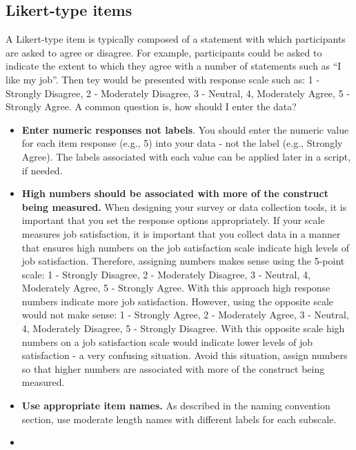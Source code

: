 \documentclass[
]{krantz}
\begin{document}
\hypertarget{likert-type-items}{%
\subsection{Likert-type items}\label{likert-type-items}}

A Likert-type item is typically composed of a statement with which participants are asked to agree or disagree. For example, participants could be asked to indicate the extent to which they agree with a number of statements such as ``I like my job''. Then tey would be presented with response scale such as: 1 - Strongly Disagree, 2 - Moderately Disagree, 3 - Neutral, 4, Moderately Agree, 5 - Strongly Agree. A common question is, how should I enter the data?

\begin{itemize}
\item
  \textbf{Enter numeric responses not labels}. You should enter the numeric value for each item response (e.g., 5) into your data - not the label (e.g., Strongly Agree). The labels associated with each value can be applied later in a script, if needed.
\item
  \textbf{High numbers should be associated with more of the construct being measured.} When designing your survey or data collection tools, it is important that you set the response options appropriately. If your scale measures job satisfaction, it is important that you collect data in a manner that ensures high numbers on the job satisfaction scale indicate high levels of job satisfaction. Therefore, assigning numbers makes sense using the 5-point scale: 1 - Strongly Disagree, 2 - Moderately Disagree, 3 - Neutral, 4, Moderately Agree, 5 - Strongly Agree. With this approach high response numbers indicate more job satisfaction. However, using the opposite scale would not make sense: 1 - Strongly Agree, 2 - Moderately Agree, 3 - Neutral, 4, Moderately Disagree, 5 - Strongly Disagree. With this opposite scale high numbers on a job satisfaction scale would indicate lower levels of job satisfaction - a very confusing situation. Avoid this situation, assign numbers so that higher numbers are associated with more of the construct being measured.
\item
  \textbf{Use appropriate item names.} As described in the naming convention section, use moderate length names with different labels for each subscale.
\item

\end{itemize}
\end{document}
